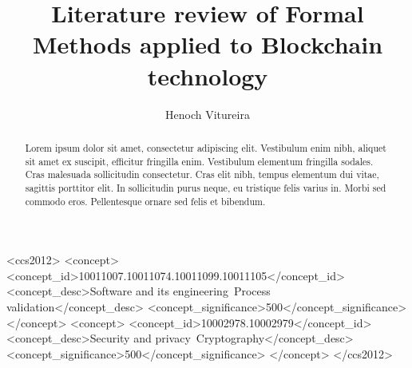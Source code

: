 \documentclass[sigconf, nonacm]{acmart}
\begin{document}
\title{Literature review of Formal Methods applied to Blockchain technology}

\author{Henoch Vitureira}


\renewcommand{\shortauthors}{Henoch Vitureira}

\begin{abstract}
  Lorem ipsum dolor sit amet, consectetur adipiscing elit. 
  Vestibulum enim nibh, aliquet sit amet ex suscipit, efficitur fringilla enim. 
  Vestibulum elementum fringilla sodales. Cras malesuada sollicitudin consectetur.
  Cras elit nibh, tempus elementum dui vitae, sagittis porttitor elit. In sollicitudin purus neque, eu tristique felis varius in. Morbi sed commodo eros.
  Pellentesque ornare sed felis et bibendum.
\end{abstract}

\begin{CCSXML}
  <ccs2012>
  <concept>
  <concept_id>10011007.10011074.10011099.10011105</concept_id>
  <concept_desc>Software and its engineering~Process validation</concept_desc>
  <concept_significance>500</concept_significance>
  </concept>
  <concept>
  <concept_id>10002978.10002979</concept_id>
  <concept_desc>Security and privacy~Cryptography</concept_desc>
  <concept_significance>500</concept_significance>
  </concept>
  </ccs2012>
\end{CCSXML}




\maketitle
\end{document}
